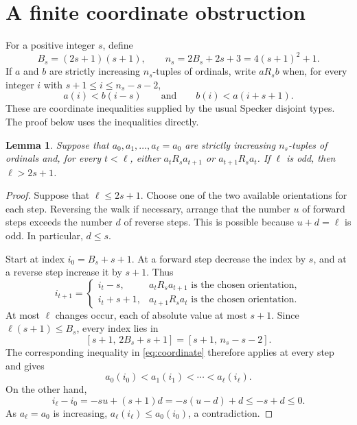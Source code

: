 \documentclass[11pt,leqno]{amsart}
\newtheorem{lemma}[theorem]{Lemma}
\theoremstyle{definition}
\numberwithin{equation}{section}
\begin{document}
\section{A finite coordinate obstruction}
For a positive integer $s$, define
\begin{equation}\label{eq:width}
B_s=(2s+1)(s+1),\qquad n_s=2B_s+2s+3=4(s+1)^2+1.
\end{equation}
If $a$ and $b$ are strictly increasing $n_s$-tuples of ordinals, write $a\mathrel{R_s}b$ when, for every integer $i$ with $s+1\le i\le n_s-s-2$,
\begin{equation}\label{eq:coordinate}
a(i)<b(i-s)
\qquad\text{and}\qquad
b(i)<a(i+s+1).
\end{equation}
These are coordinate inequalities supplied by the usual Specker disjoint types. The proof below uses the inequalities directly.

\begin{lemma}\label{lem:odd-walk}
Suppose that $a_0,a_1,\ldots,a_\ell=a_0$ are strictly increasing $n_s$-tuples of ordinals and, for every $t<\ell$, either $a_t\mathrel{R_s}a_{t+1}$ or $a_{t+1}\mathrel{R_s}a_t$. If $\ell$ is odd, then $\ell>2s+1$.
\end{lemma}

\begin{proof}
Suppose that $\ell\le2s+1$. Choose one of the two available orientations for each step. Reversing the walk if necessary, arrange that the number $u$ of forward steps exceeds the number $d$ of reverse steps. This is possible because $u+d=\ell$ is odd. In particular, $d\le s$.

Start at index $i_0=B_s+s+1$. At a forward step decrease the index by $s$, and at a reverse step increase it by $s+1$. Thus
\[
i_{t+1}=\begin{cases}
i_t-s,&a_t\mathrel{R_s}a_{t+1}\text{ is the chosen orientation},\\
i_t+s+1,&a_{t+1}\mathrel{R_s}a_t\text{ is the chosen orientation}.
\end{cases}
\]
At most $\ell$ changes occur, each of absolute value at most $s+1$. Since $\ell(s+1)\le B_s$, every index lies in
\[
[s+1,\,2B_s+s+1]=[s+1,\,n_s-s-2].
\]
The corresponding inequality in \eqref{eq:coordinate} therefore applies at every step and gives
\[
a_0(i_0)<a_1(i_1)<\cdots<a_\ell(i_\ell).
\]
On the other hand,
\[
i_\ell-i_0=-su+(s+1)d=-s(u-d)+d\le-s+d\le0.
\]
As $a_\ell=a_0$ is increasing, $a_\ell(i_\ell)\le a_0(i_0)$, a contradiction.
\end{proof}
\end{document}
